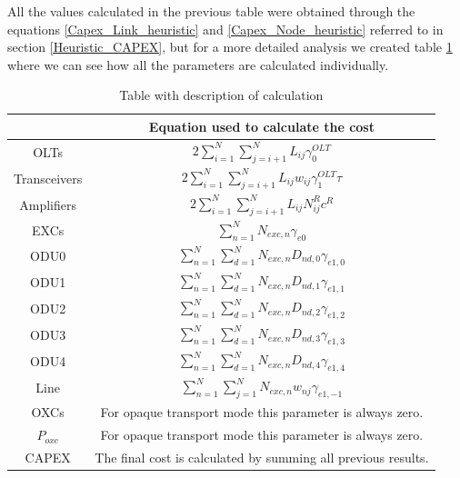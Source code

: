 All the values calculated in the previous table were obtained through the equations \ref{Capex_Link_heuristic} and \ref{Capex_Node_heuristic} referred to in section \ref{Heuristic_CAPEX}, but for a more detailed analysis we created table \ref{formulas_opaque_heuristic} where we can see how all the parameters are calculated individually.\\

\begin{table}[H]
\centering
\begin{tabular}{|| c | c ||}
 \hline
  & Equation used to calculate the cost \\ \hline
 OLTs & \(\displaystyle 2 \sum_{i=1}^{N}\sum_{j=i+1}^{N} L_{ij} \gamma_0^{OLT} \) \\ \hline
 Transceivers & \(\displaystyle 2 \sum_{i=1}^{N}\sum_{j=i+1}^{N} L_{ij} w_{ij} \gamma_1^{OLT} \tau \) \\ \hline
 Amplifiers & \(\displaystyle 2 \sum_{i=1}^{N}\sum_{j=i+1}^{N} L_{ij} N^R_{ij} c^R \) \\ \hline
 EXCs & \(\displaystyle \sum_{n=1}^N N_{exc,n} \gamma_{e0} \) \\ \hline
 ODU0 & \(\displaystyle \sum_{n=1}^{N} \sum_{d=1}^{N} N_{exc,n} D_{nd,0} \gamma_{e1,0} \) \\ \hline
 ODU1 & \(\displaystyle \sum_{n=1}^{N} \sum_{d=1}^{N} N_{exc,n} D_{nd,1} \gamma_{e1,1} \) \\ \hline
 ODU2 & \(\displaystyle \sum_{n=1}^{N} \sum_{d=1}^{N} N_{exc,n} D_{nd,2} \gamma_{e1,2} \)\\ \hline
 ODU3 & \(\displaystyle \sum_{n=1}^{N} \sum_{d=1}^{N} N_{exc,n} D_{nd,3} \gamma_{e1,3} \) \\ \hline
 ODU4 & \(\displaystyle \sum_{n=1}^{N} \sum_{d=1}^{N} N_{exc,n} D_{nd,4} \gamma_{e1,4} \) \\ \hline
 Line & \(\displaystyle \sum_{n=1}^{N} \sum_{j=1}^{N} N_{exc,n} w_{nj} \gamma_{e1,-1} \) \\ \hline
 OXCs & For opaque transport mode this parameter is always zero. \\ \hline
 $P_{oxc}$ & For opaque transport mode this parameter is always zero. \\ \hline
 CAPEX & The final cost is calculated by summing all previous results. \\
 \hline
 \end{tabular}
\caption{Table with description of calculation}
\label{formulas_opaque_heuristic}
\end{table}


